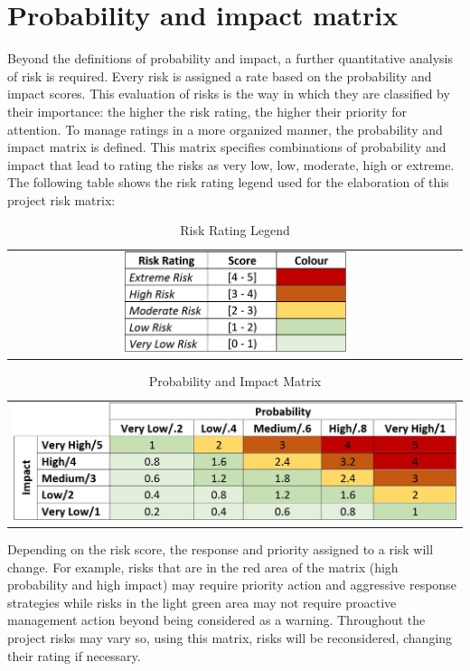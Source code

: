 \section{Probability and impact matrix}
Beyond the definitions of probability and impact, a further quantitative analysis of risk is required. Every risk is assigned a rate based on the probability and impact scores. This evaluation of risks is the way in which they are classified by their importance: the higher the risk rating, the higher their priority for attention. To manage ratings in a more organized manner, the probability and impact matrix is defined. This matrix specifies combinations of probability and impact that lead to rating the risks as very low, low, moderate, high or extreme. The following table shows the risk rating legend used for the elaboration of this project risk matrix:
\begin{table}[H]
\centering
\begin{tabular}{c}
	\includegraphics[width=0.5\textwidth]{./images/RiskRating}
\end{tabular}
\caption{Risk Rating Legend}
\end{table}
\begin{table}[H]
	\centering
	\begin{tabular}{c}
	\includegraphics[width=\textwidth]{./images/Probability_and_impact_matrix}
	\end{tabular}
	\caption{Probability and Impact Matrix}
\end{table}
Depending on the risk score, the response and priority assigned to a risk will change. For example, risks that are in the red area of the matrix (high probability and high impact) may require priority action and aggressive response strategies while risks in the light green area may not require proactive management action beyond being considered as a warning.
Throughout the project risks may vary so, using this matrix, risks will be reconsidered, changing their rating if necessary.
